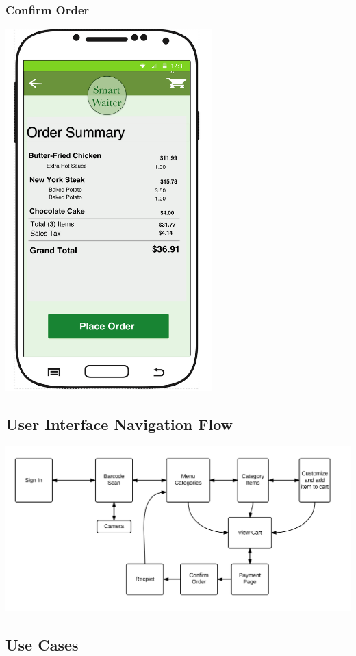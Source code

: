 \documentclass[12pt, titlepage]{article}
\begin{document}
\subsubsection{Confirm Order}
\includegraphics[width=80mm,scale=0.5]{OrderSummary.png}

\subsection{User Interface Navigation Flow}

\includegraphics[width=180mm,scale=0.5]{UIProcess.png}

\subsection{Use Cases}
\end{document}
